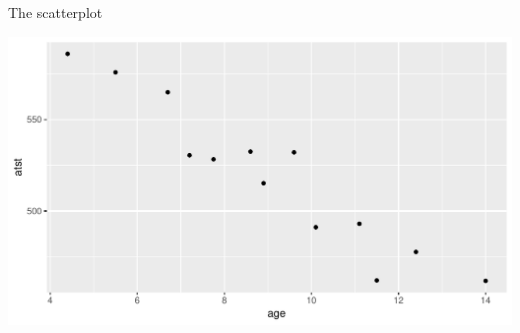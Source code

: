 \begin{frame}[fragile]{The scatterplot}
   
\begin{knitrout}
\color{fgcolor}\begin{kframe}
\begin{alltt}
\hlstd{(}\hlopt{+}\hlstd{()}
\end{alltt}
\end{kframe}
\includegraphics[width=\maxwidth]{figure/suggo-1} 

\end{knitrout}
  
  

\end{frame}

